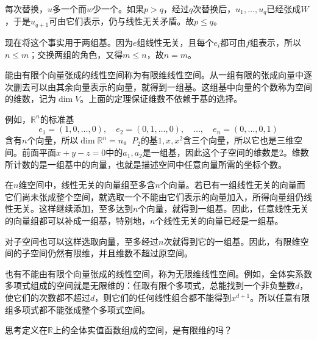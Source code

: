 每次替换，\(u\)多一个而\(w\)少一个。如果\(p > q\)，经过\(q\)次替换后，\(u_{1} , \ldots , u_{q}\)已经张成\(W\)，于是\(u_{q + 1}\)可由它们表示，仍与线性无关矛盾。故\(p \le q\)。

现在将这个事实用于两组基。因为\(e\)组线性无关，且每个\(e_{i}\)都可由\(f\)组表示，所以\(n \le m\)；交换两组的角色，又得\(m \le n\)，故\(n = m\)。

能由有限个向量张成的线性空间称为{\heiti{}有限维线性空间}。从一组有限的张成向量中逐次删去可以由其余向量表示的向量，就得到一组基。这组基中向量的个数称为空间的{\heiti{}维数}，记为\(\dim V\)。上面的定理保证维数不依赖于基的选择。

例如，\(\mathbb{R}^{n}\)的标准基
\begin{equation}
    e_{1} = \left( 1 , 0 , \ldots , 0 \right) , \quad
    e_{2} = \left( 0 , 1 , \ldots , 0 \right) , \quad \ldots , \quad
    e_{n} = \left( 0 , \ldots , 0 , 1 \right)
\end{equation}
含有\(n\)个向量，所以\(\dim \mathbb{R}^{n} = n\)。\(P_{2}\)的基\(1 , x , x^{2}\)含三个向量，所以它也是三维空间。前面平面\(x + y - z = 0\)中的\(a_{1} , a_{2}\)是一组基，因此这个子空间的维数是\(2\)。维数所计数的是一组基中的向量，也就是描述空间中任意向量所需的坐标个数。

在\(n\)维空间中，线性无关的向量组至多含\(n\)个向量。若已有一组线性无关的向量而它们尚未张成整个空间，就选取一个不能由它们表示的向量加入，所得向量组仍线性无关。这样继续添加，至多达到\(n\)个向量，就得到一组基。因此，任意线性无关的向量组都可以补成一组基，特别地，\(n\)个线性无关的向量已经是一组基。

对子空间也可以这样选取向量，至多经过\(n\)次就得到它的一组基。因此，有限维空间的子空间仍然有限维，并且维数不超过原空间。

也有不能由有限个向量张成的线性空间，称为{\heiti{}无限维线性空间}。例如，全体实系数多项式组成的空间就是无限维的：任取有限个多项式，总能找到一个非负整数\(d\)，使它们的次数都不超过\(d\)，则它们的任何线性组合都不能得到\(x^{d + 1}\)。所以任意有限组多项式都不能张成整个多项式空间。

{\kaiti{}思考\quad 定义在\(\mathbb{R}\)上的全体实值函数组成的空间，是有限维的吗？}

